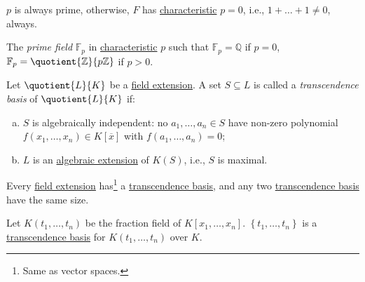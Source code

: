
\begin{remark}
	\(p\) is always prime, otherwise, \(F\) has \hyperref[def:characteristic]{characteristic} \(p = 0\), i.e., \(1 + \ldots + 1 \neq 0\), always.
\end{remark}

\begin{definition}\label{def:prime-field}
	The \emph{prime field} \(\mathbb{F} _p\) in \hyperref[def:characteristic]{characteristic} \(p\) such that \(\mathbb{F} _p = \mathbb{Q} \) if \(p = 0\), \(\mathbb{F} _p = \quotient{\mathbb{Z} }{p\mathbb{Z} } \) if \(p > 0\).
\end{definition}

\begin{definition}\label{def:transcendence-basis}
	Let \(\quotient{L}{K} \) be a \hyperref[def:field-extension]{field extension}. A set \(S \subseteq L\) is called a \emph{transcendence basis} of \(\quotient{L}{K} \) if:
	\begin{enumerate}[(a)]
		\item \(S\) is algebraically independent: no \(a_1, \ldots , a_n\in S\) have non-zero polynomial \(f(x_1, \ldots , x_n) \in K[\overline{x} ]\) with \(f(a_1, \ldots , a_n) = 0\);
		\item \(L\) is an \hyperref[def:algebraic-extension]{algebraic extension} of \(K(S)\), i.e., \(S\) is maximal.
	\end{enumerate}
\end{definition}

\begin{remark}
	Every \hyperref[def:field-extension]{field extension} has\footnote{Same as vector spaces.} a \hyperref[def:transcendence-basis]{transcendence basis}, and any two \hyperref[def:transcendence-basis]{transcendence basis} have the same size.
\end{remark}

\begin{eg}
	Let \(K(t_1, \ldots , t_n)\) be the fraction field of \(K[x_1, \ldots , x_n]\). \(\left\{ t_1, \ldots , t_n \right\} \) is a \hyperref[def:transcendence-basis]{transcendence basis} for \(K(t_1, \ldots , t_n)\) over \(K\).
\end{eg}

